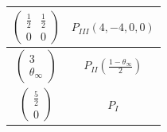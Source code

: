 \documentclass[12]{amsart}
\begin{document}
\begin{table}[h]
\begin{center}
\begin{tabular}{|c|c|}
\hline
$\begin{pmatrix}\frac{1}{2}&\frac{1}{2}\\ 0&0\end{pmatrix}$ & $P_{III}\left(4,-4,0,0\right)$\\
\hline
$\begin{pmatrix}3\\ \theta_\infty\end{pmatrix}$ & $P_{II}\left(\frac{1-\theta_\infty}{2}\right)$\\
\hline
$\begin{pmatrix}\frac{5}{2}\\ 0\end{pmatrix}$ & $P_{I}$\\
\hline
\end{tabular}
\end{center}
\label{table:Painleve}
\end{table}
\end{document}
